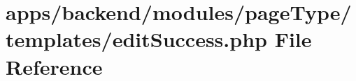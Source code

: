 \hypertarget{backend_2modules_2page_type_2templates_2edit_success_8php}{\section{apps/backend/modules/page\-Type/templates/edit\-Success.php File Reference}
\label{backend_2modules_2page_type_2templates_2edit_success_8php}
}

